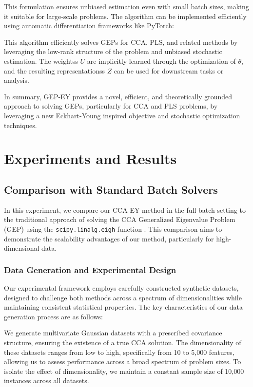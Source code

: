 This formulation ensures unbiased estimation even with small batch sizes, making it suitable for large-scale problems. The algorithm can be implemented efficiently using automatic differentiation frameworks like PyTorch:

This algorithm efficiently solves GEPs for CCA, PLS, and related methods by leveraging the low-rank structure of the problem and unbiased stochastic estimation. The \glspl{weights} $U$ are implicitly learned through the optimization of $\theta$, and the resulting \glspl{representations} $Z$ can be used for downstream tasks or analysis.

In summary, GEP-EY provides a novel, efficient, and theoretically grounded approach to solving GEPs, particularly for CCA and PLS problems, by leveraging a new Eckhart-Young inspired objective and stochastic optimization techniques.

\section{Experiments and Results}\label{sec:experiments}
\subsection{Comparison with Standard Batch Solvers}
In this experiment, we compare our CCA-EY method in the full batch setting to the traditional approach of solving the CCA Generalized Eigenvalue Problem (GEP) using the \texttt{scipy.linalg.eigh} function \citep{virtanen2020scipy}. This comparison aims to demonstrate the scalability advantages of our method, particularly for high-dimensional data.

\subsubsection{Data Generation and Experimental Design}

Our experimental framework employs carefully constructed synthetic datasets, designed to challenge both methods across a spectrum of dimensionalities while maintaining consistent statistical properties. The key characteristics of our data generation process are as follows:

We generate multivariate Gaussian datasets with a prescribed covariance structure, ensuring the existence of a true CCA solution. The dimensionality of these datasets ranges from low to high, specifically from 10 to 5,000 features, allowing us to assess performance across a broad spectrum of problem sizes. To isolate the effect of dimensionality, we maintain a constant sample size of 10,000 instances across all datasets.


